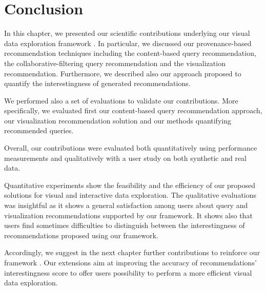  \section{Conclusion}
 

{\color{Fuchsia}In this chapter, we presented our scientific contributions underlying our visual data exploration framework \framework{}.
In particular, we discussed our provenance-based recommendation techniques including the content-based query recommendation, the collaborative-filtering query recommendation and the visualization recommendation.
Furthermore, we described also our approach proposed to quantify the interestingness of generated recommendations.

We performed also a set of evaluations to validate our contributions.  
 More specifically, we evaluated first our content-based query recommendation approach, our visualization recommendation solution and our methods quantifying recommended queries.  


Overall, our contributions were evaluated  both quantitatively using performance measurements and qualitatively with a user study on both synthetic and real data. 


Quantitative experiments show the feasibility and the efficiency of our proposed solutions for visual and interactive data exploration.
The qualitative evaluations was insightful as it shows a general satisfaction among users about query and visualization recommendations supported by our framework. 
It shows also that users find sometimes difficulties to distinguish between the interestingness of recommendations proposed using our framework.

Accordingly, we suggest in the next chapter further contributions to reinforce our framework {\color{Fuchsia}\framework{}}. Our extensions aim at improving the accuracy of recommendations' interestingness score to offer users possibility to perform a more efficient visual data exploration. }




